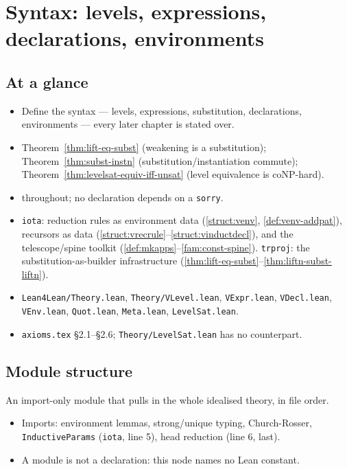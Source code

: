 \chapter{Syntax: levels, expressions, declarations, environments}
\label{chap:syntax}

\section*{At a glance}
\begin{itemize}
\item {} Define the syntax --- levels, expressions, substitution, declarations,
environments --- every later chapter is stated over.
\item {} Theorem~\ref{thm:lift-eq-subst} (weakening is a substitution);
Theorem~\ref{thm:subst-instn} (substitution/instantiation commute);
Theorem~\ref{thm:levelsat-equiv-iff-unsat} (level equivalence is coNP-hard).
\item {} \stProved{} throughout; no declaration depends on a \texttt{sorry}.
\item {} \texttt{iota}: reduction rules as environment data
(\ref{struct:venv}, \ref{def:venv-addpat}), recursors as data
(\ref{struct:vrecrule}--\ref{struct:vinductdecl}), and the telescope/spine toolkit
(\ref{def:mkapps}--\ref{fam:const-spine}). \texttt{trproj}: the substitution-as-builder
infrastructure (\ref{thm:lift-eq-subst}--\ref{thm:liftn-subst-liftn}).
\item {} \texttt{Lean4Lean/Theory.lean}, \texttt{Theory/VLevel.lean},
\texttt{VExpr.lean}, \texttt{VDecl.lean}, \texttt{VEnv.lean}, \texttt{Quot.lean},
\texttt{Meta.lean}, \texttt{LevelSat.lean}.
\item {} \texttt{axioms.tex} \S2.1--\S2.6; \texttt{Theory/LevelSat.lean} has no
counterpart.
\end{itemize}

\section{Module structure}

\begin{definition}
\label{mod:theory-root}
\leanok
{} 

 An import-only module that pulls in the whole idealised theory, in file
order.
\begin{itemize}
\item Imports: environment lemmas, strong/unique typing, Church-Rosser,
\texttt{InductiveParams} (\texttt{iota}, line 5), head reduction (line 6, last).
\item A module is not a declaration: this node names no Lean constant.
\end{itemize}
\end{definition}


